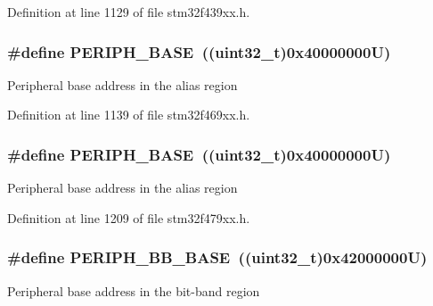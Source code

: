 Definition at line 1129 of file stm32f439xx.\+h.

\subsubsection[{\texorpdfstring{P\+E\+R\+I\+P\+H\+\_\+\+B\+A\+SE}{PERIPH_BASE}}]{\setlength{\rightskip}{0pt plus 5cm}\#define P\+E\+R\+I\+P\+H\+\_\+\+B\+A\+SE~((uint32\+\_\+t)0x40000000\+U)}\hypertarget{group___peripheral__memory__map_ga9171f49478fa86d932f89e78e73b88b0}{}\label{group___peripheral__memory__map_ga9171f49478fa86d932f89e78e73b88b0}
Peripheral base address in the alias region 

Definition at line 1139 of file stm32f469xx.\+h.

\subsubsection[{\texorpdfstring{P\+E\+R\+I\+P\+H\+\_\+\+B\+A\+SE}{PERIPH_BASE}}]{\setlength{\rightskip}{0pt plus 5cm}\#define P\+E\+R\+I\+P\+H\+\_\+\+B\+A\+SE~((uint32\+\_\+t)0x40000000\+U)}\hypertarget{group___peripheral__memory__map_ga9171f49478fa86d932f89e78e73b88b0}{}\label{group___peripheral__memory__map_ga9171f49478fa86d932f89e78e73b88b0}
Peripheral base address in the alias region 

Definition at line 1209 of file stm32f479xx.\+h.

\subsubsection[{\texorpdfstring{P\+E\+R\+I\+P\+H\+\_\+\+B\+B\+\_\+\+B\+A\+SE}{PERIPH_BB_BASE}}]{\setlength{\rightskip}{0pt plus 5cm}\#define P\+E\+R\+I\+P\+H\+\_\+\+B\+B\+\_\+\+B\+A\+SE~((uint32\+\_\+t)0x42000000\+U)}\hypertarget{group___peripheral__memory__map_gaed7efc100877000845c236ccdc9e144a}{}\label{group___peripheral__memory__map_gaed7efc100877000845c236ccdc9e144a}
Peripheral base address in the bit-\/band region 

